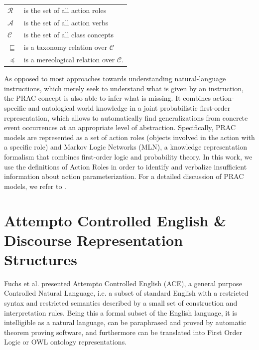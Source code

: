 \documentclass[oribibl]{llncs}
\begin{document}
\begin{center} \begin{tabular}{ll}
    $\mathcal{R}$  & is the set of all action roles\\
    $\mathcal{A}$  & is the set of all action verbs\\
    $\mathcal{C}$  & is the set of all class concepts\\
    $\sqsubseteq$ & is a taxonomy relation over $\mathcal{C}$\\
    $\preceq$	& is a mereological relation over $\mathcal{C}$.
\end{tabular}
\end{center}
As opposed to most approaches towards understanding natural-language 
instructions, which merely seek to understand what is given by an 
instruction, the PRAC concept is also able to infer what is missing. 
It combines action-specific and ontological world knowledge in a 
joint probabilistic first-order representation, which allows to 
automatically find generalizations from concrete event occurrences 
at an appropriate level of abstraction. Specifically, PRAC models 
are represented as a set of action roles (objects involved in the 
action with a specific role) and Markov Logic Networks (MLN), a 
knowledge representation formalism that combines first-order logic 
and probability theory\cite{DBLP:journals/ml/RichardsonD06}. In this
work, we use the definitions of Action Roles in order to identify and
verbalize insufficient information about action parameterization. For a 
detailed discussion of PRAC models, we refer to \cite{nyga12actioncore}.

\section{Attempto Controlled English \& Discourse Representation Structures}

Fuchs et al.\cite{fuchs:flairs2006} presented Attempto Controlled English (ACE), a general purpose Controlled Natural Language, i.e. a subset of standard English with a restricted syntax and restricted semantics described by a small set of construction and interpretation rules.
Being this a formal subset of the English language, it is intelligible as a natural language, can be paraphrased and proved by automatic theorem proving software, and furthermore can be translated into First Order Logic or OWL ontology representations.
\end{document}
